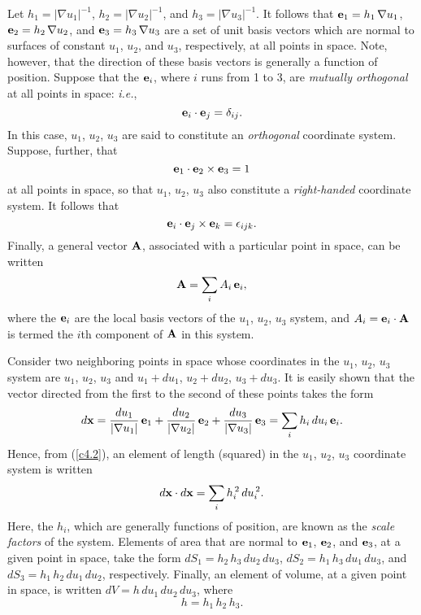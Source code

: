 Let $h_1=|\nabla u_1|^{-1}$, $h_2=|\nabla u_2|^{-1}$, and $h_3=|\nabla u_3|^{-1}$. It follows that
${\bf e}_1=h_1\,\nabla u_1$, ${\bf e}_2=h_2\,\nabla u_2$, and ${\bf e}_3=h_3\,\nabla u_3$ are
a set of unit basis vectors which are  normal to surfaces of constant $u_1$, $u_2$, and $u_3$, respectively, at all points
in space. Note, however,  that the direction of these basis vectors is generally a function of position. Suppose that
the ${\bf e}_i$, where $i$ runs from 1 to 3, are {\em mutually orthogonal}\/ at all points in space: {\em i.e.},
\begin{equation}\label{c4.2}
{\bf e}_i\cdot {\bf e}_j = \delta_{ij}.
\end{equation}
In this case, $u_1$, $u_2$,  $u_3$ are said to constitute an  {\em orthogonal}\/ coordinate system.
Suppose, further, that
\begin{equation}\label{c4.3}
{\bf e}_1\cdot {\bf e}_2\times {\bf e}_3 = 1
\end{equation}
at all points in space, so that $u_1$, $u_2$,  $u_3$   also constitute a {\em right-handed}\/
 coordinate system. It follows that
\begin{equation}\label{c4.4}
{\bf e}_i\cdot{\bf e}_j\times {\bf e}_k = \epsilon_{ijk}.
\end{equation}
Finally, a general vector ${\bf A}$, associated with  a particular point in space, can be written
\begin{equation}
{\bf A} = \sum_i A_i\,{\bf e}_i,
\end{equation}
where the ${\bf e}_i$ are the local basis vectors of the $u_1$, $u_2$, $u_3$ system, and $A_i={\bf e}_i\cdot {\bf A}$ is termed the $i$th component of ${\bf A}$ in this system. 

Consider two neighboring points in space whose coordinates in the $u_1$, $u_2$, $u_3$ system  are $u_1$, $u_2$, $u_3$ and $u_1+d u_1$, $u_2+d u_2$, $u_3+d u_3$.
It is easily shown that the vector directed from the first to the second of these points takes the form
\begin{equation}
d {\bf x} = \frac{du_1}{|\nabla u_1|}\,{\bf e}_1 + \frac{du_2}{|\nabla u_2|}\,{\bf e}_2+\frac{du_3}{|\nabla u_3|}\,{\bf e}_3=\sum_i h_i\,du_i\,{\bf e}_i.
\end{equation}
Hence, from (\ref{c4.2}), an element of length (squared) in the $u_1$, $u_2$, $u_3$ coordinate system is written
\begin{equation}\label{c4.7}
d{\bf x}\cdot d{\bf x}= \sum_i h_i^{\,2}\,du_i^{\,2}.
\end{equation}
Here, the $h_i$, which are generally functions of position, are known as the {\em scale factors}\/ of the  system. 
Elements of area that are normal to ${\bf e}_1$, ${\bf e}_2$, and ${\bf e}_3$, at a given point in space,  take the form $dS_1 = h_2\,h_3\,du_2\,du_3$,
$dS_2 = h_1\,h_3\,du_1\,du_3$,  and $dS_3 = h_1\,h_2\,du_1\,du_2$, respectively. Finally, an element of
volume, at a given point in space, is written $dV = h\,du_1\,du_2\,du_3$, where
\begin{equation}
h = h_1\,h_2\,h_3.
\end{equation}

